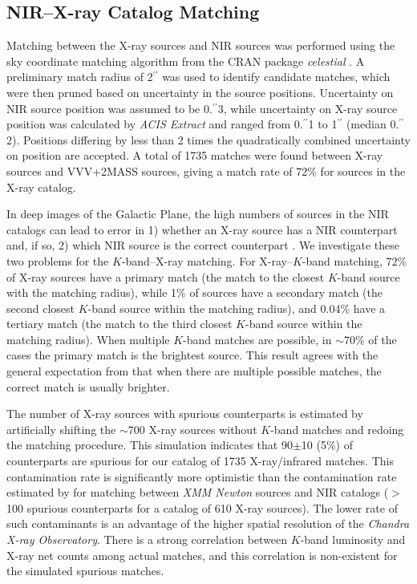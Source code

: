 \documentclass[twocolumn,tighten]{aastex61}
\begin{document}
\subsection{NIR--X-ray Catalog Matching \label{match.sec}}

Matching between the X-ray sources and NIR sources was performed using the sky coordinate matching algorithm from the CRAN package {\it celestial} \citep{2016ascl.soft02011R}.
A preliminary match radius of 2$^{\prime\prime}$ was used to identify candidate matches, which were then pruned based on uncertainty in the source positions. Uncertainty on NIR source position was assumed to be $0.\!^{\prime\prime}$3, while uncertainty on X-ray source position was calculated by {\it ACIS Extract} and ranged from $0.\!^{\prime\prime}$1 to 1$^{\prime\prime}$ (median $0.\!^{\prime\prime}$2). Positions differing by less than 2 times the quadratically combined uncertainty on position are accepted. A total of 1735 matches were found between X-ray sources and VVV+2MASS sources, giving a match rate of 72\% for sources in the X-ray catalog.

In deep images of the Galactic Plane, the high numbers of sources in the NIR catalogs can lead to error in 1) whether an X-ray source has a NIR counterpart and, if so, 2) which NIR source is the correct counterpart \citep{2013ApJS..209...30N}. We investigate these two problems for the $K$-band--X-ray matching. For X-ray--$K$-band matching, 72\% of X-ray sources have a primary match (the match to the closest $K$-band source with the matching radius), while 1\% of sources have a secondary match (the second closest $K$-band source within the matching radius), and 0.04\% have a tertiary match (the match to the third closest $K$-band source within the matching radius). When multiple $K$-band matches are possible, in $\sim$70\% of the cases the primary match is the brightest source. This result agrees with the general expectation from \citeauthor{2013ApJS..209...30N} that when there are multiple possible matches, the correct match is usually brighter. 

The number of X-ray sources with spurious counterparts is estimated by artificially shifting the $\sim$700 X-ray sources without $K$-band matches and redoing the matching procedure. This simulation indicates that 90$\pm$10 (5\%) of counterparts are spurious for our catalog of 1735 X-ray/infrared matches. This contamination rate is significantly more optimistic than the contamination rate estimated by \citet{2006A&A...454.1047S} for matching between {\it XMM Newton} sources and NIR catalogs ($>$100 spurious counterparts for a catalog of 610 X-ray sources). The lower rate of such contaminants is an advantage of the higher spatial resolution of the {\it Chandra X-ray Observatory}. There is a strong correlation between $K$-band luminosity and X-ray net counts among actual matches, and this correlation is non-existent for the simulated spurious matches. 
\end{document}
